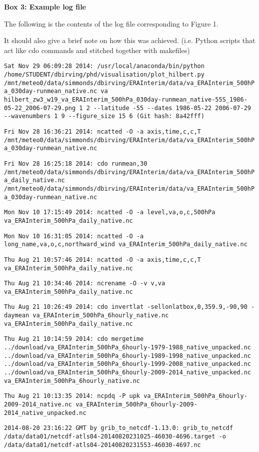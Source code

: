 \textbf{Box 3: Example log file}

The following is the contents of the log file corresponding to Figure 1. 

It should also give a brief note on how this was achieved. (i.e. Python scripts that act like cdo commands and stitched together with makefiles)

\verb|Sat Nov 29 06:09:28 2014: /usr/local/anaconda/bin/python /home/STUDENT/dbirving/phd/visualisation/plot_hilbert.py /mnt/meteo0/data/simmonds/dbirving/ERAInterim/data/va_ERAInterim_500hPa_030day-runmean_native.nc va hilbert_zw3_w19_va_ERAInterim_500hPa_030day-runmean_native-55S_1986-05-22_2006-07-29.png 1 2 --latitude -55 --dates 1986-05-22 2006-07-29 --wavenumbers 1 9 --figure_size 15 6 (Git hash: 8a42fff)| 

\verb|Fri Nov 28 16:36:21 2014: ncatted -O -a axis,time,c,c,T /mnt/meteo0/data/simmonds/dbirving/ERAInterim/data/va_ERAInterim_500hPa_030day-runmean_native.nc| 

\verb|Fri Nov 28 16:25:18 2014: cdo runmean,30 /mnt/meteo0/data/simmonds/dbirving/ERAInterim/data/va_ERAInterim_500hPa_daily_native.nc /mnt/meteo0/data/simmonds/dbirving/ERAInterim/data/va_ERAInterim_500hPa_030day-runmean_native.nc| 

\verb|Mon Nov 10 17:15:49 2014: ncatted -O -a level,va,o,c,500hPa va_ERAInterim_500hPa_daily_native.nc| 

\verb|Mon Nov 10 16:31:05 2014: ncatted -O -a long_name,va,o,c,northward_wind va_ERAInterim_500hPa_daily_native.nc| 

\verb|Thu Aug 21 10:57:46 2014: ncatted -O -a axis,time,c,c,T va_ERAInterim_500hPa_daily_native.nc| 

\verb|Thu Aug 21 10:34:46 2014: ncrename -O -v v,va va_ERAInterim_500hPa_daily_native.nc| 

\verb|Thu Aug 21 10:26:49 2014: cdo invertlat -sellonlatbox,0,359.9,-90,90 -daymean va_ERAInterim_500hPa_6hourly_native.nc va_ERAInterim_500hPa_daily_native.nc| 

\verb|Thu Aug 21 10:14:59 2014: cdo mergetime ../download/va_ERAInterim_500hPa_6hourly-1979-1988_native_unpacked.nc ../download/va_ERAInterim_500hPa_6hourly-1989-1998_native_unpacked.nc ../download/va_ERAInterim_500hPa_6hourly-1999-2008_native_unpacked.nc ../download/va_ERAInterim_500hPa_6hourly-2009-2014_native_unpacked.nc va_ERAInterim_500hPa_6hourly_native.nc| 

\verb|Thu Aug 21 10:13:35 2014: ncpdq -P upk va_ERAInterim_500hPa_6hourly-2009-2014_native.nc va_ERAInterim_500hPa_6hourly-2009-2014_native_unpacked.nc|

\verb|2014-08-20 23:16:22 GMT by grib_to_netcdf-1.13.0: grib_to_netcdf /data/data01/netcdf-atls04-20140820231025-46030-4696.target -o /data/data01/netcdf-atls04-20140820231553-46030-4697.nc|